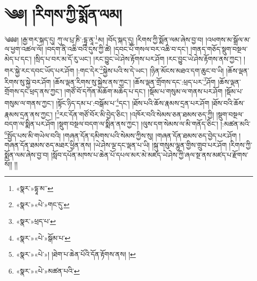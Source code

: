 \chapter{༄༅། །རིགས་ཀྱི་སྨོན་ལམ།}༄༅༅། །རྒྱ་གར་སྐད་དུ། ཀུ་ལ་པྲ་ཎི་:དྷཱ་ནཱ་\footnote{«སྣར་»དྷཱ་མ་་}མ། །བོད་སྐད་དུ། །རིགས་ཀྱི་སྨོན་ལམ་ཞེས་བྱ་བ། །འཕགས་མ་སྒྲོལ་མ་ལ་ཕྱག་འཚལ་ལོ། །བདག་ནི་འཆི་བའི་དུས་ཀྱི་ཚེ། །དབང་པོ་གསལ་བར་འཆི་བ་དང་། །གནད་གཅོད་སྡུག་བསྔལ་མེད་པ་དང་། །སྲིད་པ་བར་མ་དོ་རུ་ཡང་། །རང་བྱུང་ཡེ་ཤེས་རྟོགས་པར་ཤོག །རང་བྱུང་ཡེ་ཤེས་རྟོགས་ནས་ཀྱང་། །གར་སྐྱེ་རང་དབང་ཡོད་པར་ཤོག །:གང་དེར་\footnote{«སྣར་»«པེ་»གང་དུ་}སྐྱེས་པའི་ས་དེ་ཡང་། །ཉིན་མོངས་མཐའ་དག་ཆུང་བ་ཡི། །ཆོས་ལྡན་རིགས་སུ་སྐྱེ་བར་ཤོག །ཆོས་ལྡན་རིགས་སུ་སྐྱེས་ནས་ཀྱང་། །ཆོས་ལྡན་གྲོགས་དང་:ཕྲད་པར་\footnote{«སྣར་»ཕྲད་པ་}ཤོག །ཆོས་ལྡན་གྲོགས་དང་ཕྲད་ནས་ཀྱང་། །གཙོ་བོ་དཀོན་མཆོག་མཆོད་པ་དང་། །སྡོམ་པ་གསུམ་ལ་གནས་པར་ཤོག །སྡོམ་པ་གསུམ་ལ་གནས་ཀྱང་། །སྟོང་ཉིད་དམ་པ་:བསྒོམ་པ་\footnote{«སྣར་»«པེ་»སྒོམ་པ་}དང་། །ཐོས་པའི་ཆོས་རྣམས་དྲན་པར་ཤོག །ཐོས་བའི་ཆོས་རྣམས་དྲན་ནས་ཀྱང་། །\footnote{«སྣར་»«པེ་»། །ཐེག་པ་ཆེན་པོའི་དོན་རྟོགས་ནས། །}རང་དོན་གཙོ་བོར་མི་བྱེད་ཅིང་། །འཁོར་བའི་སེམས་ཅན་ཐམས་ཅད་ཀྱི། །སྡུག་བསྔལ་བདག་ལ་སྨིན་པར་ཤོག །སྡུག་བསྔལ་བདག་ལ་སྨིན་ནས་ཀྱང་། །ལུས་དག་སེམས་ལ་མི་གནོད་ཅིང་། །:མཚན་མའི་\footnote{«སྣར་»«པེ་»མཚན་པའི་}སྤྱོད་པས་མི་གཡེལ་བའི། །གཞན་དོན་དམིགས་པའི་སེམས་ཀྱིས་སུ། །གཞན་དོན་ཐམས་ཅད་བྱེད་པར་ཤོག །གཞན་དོན་ཐམས་ཅད་མཐར་ཕྱིན་ནས། །ཡེ་ཤེས་ལྔ་དང་ལྡན་པ་ཡི། །སྐུ་གསུམ་ལྷུན་གྱིས་གྲུབ་པར་ཤོག །རིགས་ཀྱི་སྨོན་ལམ་ཞེས་བྱ་བ། །སློབ་དཔོན་མཁས་པ་ཆེན་པོ་དཔལ་མར་མེ་མཛད་ཡེ་ཤེས་ཀྱི་ཞལ་སྔ་ནས་མཛད་པ་རྫོགས་སོ།། །།